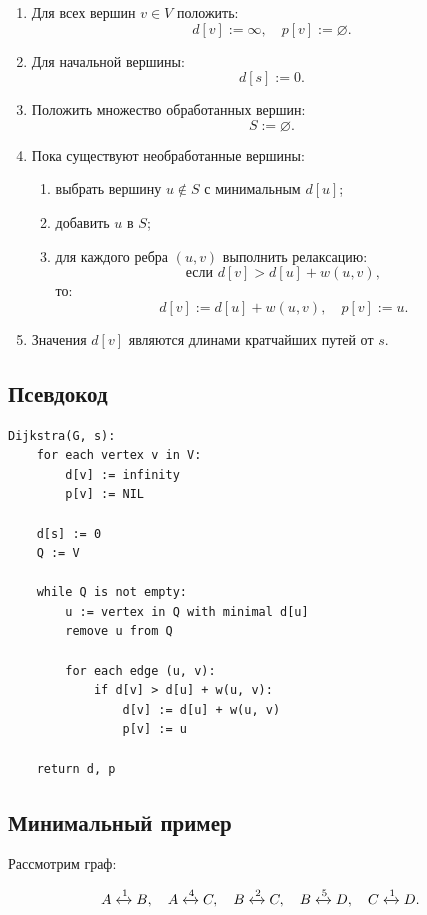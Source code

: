 \documentclass[12pt,a4paper]{article}
\begin{document}
\begin{enumerate}
    \item Для всех вершин $v \in V$ положить:
    \[
    d[v] := \infty,\quad p[v] := \varnothing.
    \]
    \item Для начальной вершины:
    \[
    d[s] := 0.
    \]
    \item Положить множество обработанных вершин:
    \[
    S := \varnothing.
    \]
    \item Пока существуют необработанные вершины:
    \begin{enumerate}
        \item выбрать вершину $u \notin S$ с минимальным $d[u]$;
        \item добавить $u$ в $S$;
        \item для каждого ребра $(u,v)$ выполнить релаксацию:
        \[
        \text{если } d[v] > d[u] + w(u,v),
        \]
        то:
        \[
        d[v] := d[u] + w(u,v), \quad p[v] := u.
        \]
    \end{enumerate}
    \item Значения $d[v]$ являются длинами кратчайших путей от $s$.
\end{enumerate}

\subsection{Псевдокод}

\begin{lstlisting}
Dijkstra(G, s):
    for each vertex v in V:
        d[v] := infinity
        p[v] := NIL

    d[s] := 0
    Q := V

    while Q is not empty:
        u := vertex in Q with minimal d[u]
        remove u from Q

        for each edge (u, v):
            if d[v] > d[u] + w(u, v):
                d[v] := d[u] + w(u, v)
                p[v] := u

    return d, p
\end{lstlisting}

\subsection{Минимальный пример}

Рассмотрим граф:

\[
A \xleftrightarrow{1} B,\quad
A \xleftrightarrow{4} C,\quad
B \xleftrightarrow{2} C,\quad
B \xleftrightarrow{5} D,\quad
C \xleftrightarrow{1} D.
\]
\end{document}
